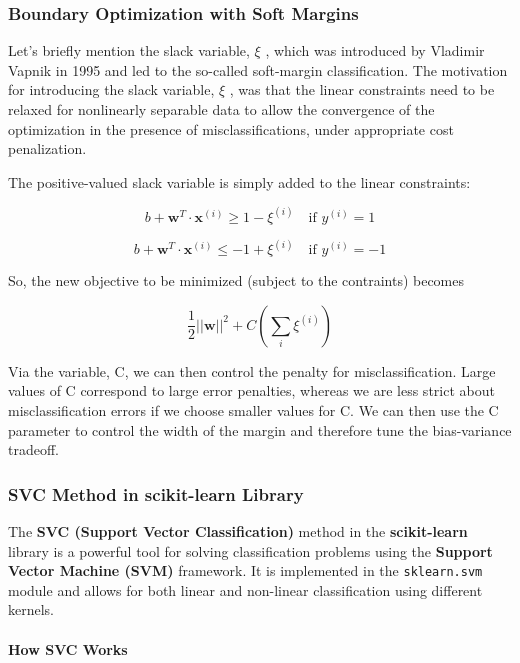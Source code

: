 \documentclass[11pt]{article}
\begin{document}
    \subsubsection{Boundary Optimization with Soft
Margins}\label{boundary-optimization-with-soft-margins}

Let's briefly mention the slack variable, $\xi$ , which was introduced
by Vladimir Vapnik in 1995 and led to the so-called soft-margin
classification. The motivation for introducing the slack variable,
$\xi$ , was that the linear constraints need to be relaxed for
nonlinearly separable data to allow the convergence of the optimization
in the presence of misclassifications, under appropriate cost
penalization.

The positive-valued slack variable is simply added to the linear
constraints:

$$b + \mathbf{w}^𝑇 \cdot \mathbf{x}^{(𝑖)} \ge 1  - \xi^{(i)}\quad \text{if } 𝑦^{(𝑖)} = 1$$

$$b + \mathbf{w}^𝑇 \cdot \mathbf{x}^{(𝑖)} \le -1  + \xi^{(i)}\quad \text{if } 𝑦^{(𝑖)} = -1$$

So, the new objective to be minimized (subject to the contraints)
becomes

\begin{equation}
\frac{1}{2} \vert\vert \mathbf{w} \vert\vert^2 + C \left( \sum_i \xi^{(i)} \right)
\end{equation}

Via the variable, C, we can then control the penalty for
misclassification. Large values of C correspond to large error
penalties, whereas we are less strict about misclassification errors if
we choose smaller values for C. We can then use the C parameter to
control the width of the margin and therefore tune the bias-variance
tradeoff.

    \subsubsection{SVC Method in scikit-learn
Library}\label{svc-method-in-scikit-learn-library}

The \textbf{SVC (Support Vector Classification)} method in the
\textbf{scikit-learn} library is a powerful tool for solving
classification problems using the \textbf{Support Vector Machine (SVM)}
framework. It is implemented in the \texttt{sklearn.svm} module and
allows for both linear and non-linear classification using different
kernels.

\paragraph{\texorpdfstring{\textbf{How SVC
Works}}{How SVC Works}}\label{how-svc-works}
\end{document}
